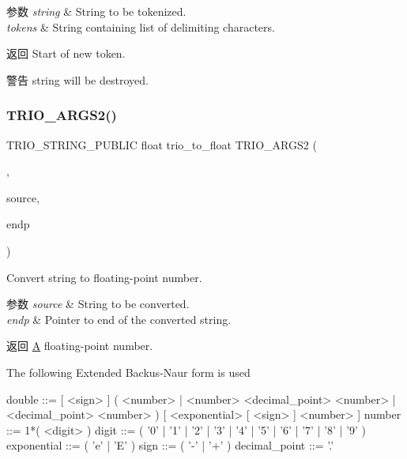\begin{DoxyParams}{参数}
{\em string} & String to be tokenized. \\
\hline
{\em tokens} & String containing list of delimiting characters. \\
\hline
\end{DoxyParams}
\begin{DoxyReturn}{返回}
Start of new token.
\end{DoxyReturn}
\begin{DoxyWarning}{警告}
{\ttfamily string} will be destroyed. 
\end{DoxyWarning}
\mbox{\label{group___static_strings_gaed92d5fa148b528a8b3c0e37c7b8a64f}} 
\subsubsection{\texorpdfstring{T\+R\+I\+O\+\_\+\+A\+R\+G\+S2()}{TRIO\_ARGS2()}\hspace{0.1cm}{\footnotesize\ttfamily [9/9]}}
{\footnotesize\ttfamily T\+R\+I\+O\+\_\+\+S\+T\+R\+I\+N\+G\+\_\+\+P\+U\+B\+L\+IC float trio\+\_\+to\+\_\+float T\+R\+I\+O\+\_\+\+A\+R\+G\+S2 (\begin{DoxyParamCaption}\item[{(\hyperlink{structsource}{source}, endp)}]{,  }\item[{T\+R\+I\+O\+\_\+\+C\+O\+N\+ST char $\ast$}]{source,  }\item[{char $\ast$$\ast$}]{endp }\end{DoxyParamCaption})}

Convert string to floating-\/point number.


\begin{DoxyParams}{参数}
{\em source} & String to be converted. \\
\hline
{\em endp} & Pointer to end of the converted string. \\
\hline
\end{DoxyParams}
\begin{DoxyReturn}{返回}
\hyperlink{struct_a}{A} floating-\/point number.
\end{DoxyReturn}
The following Extended Backus-\/\+Naur form is used \begin{DoxyVerb}double        ::= [ <sign> ]
                  ( <number> |
                    <number> <decimal_point> <number> |
                    <decimal_point> <number> )
                  [ <exponential> [ <sign> ] <number> ]
number        ::= 1*( <digit> )
digit         ::= ( '0' | '1' | '2' | '3' | '4' | '5' | '6' | '7' | '8' | '9' )
exponential   ::= ( 'e' | 'E' )
sign          ::= ( '-' | '+' )
decimal_point ::= '.'
\end{DoxyVerb}


